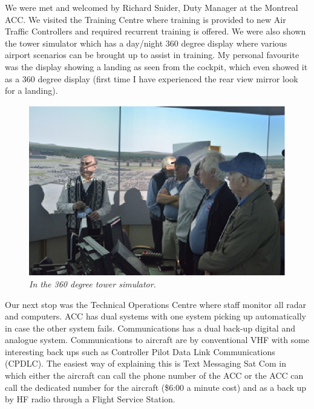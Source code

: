 We were met and welcomed by Richard Snider, Duty Manager at the
Montreal ACC. We visited the Training Centre where training is
provided to new Air Traffic Controllers and required recurrent
training is offered. We were also shown the tower simulator which has
a day/night 360 degree display where various airport scenarios can be
brought up to assist in training. My personal favourite was the
display showing a landing as seen from the cockpit, which even showed
it as a 360 degree display (first time I have experienced the rear
view mirror look for a landing).

\begin{figure}[htbp]
   \vspace{2em}
   \centering
   \includegraphics[scale=0.5]{yul_tca3.eps}
   \caption*{\small \em In the 360 degree tower simulator.}
   \label{fig:tca3}
\end{figure}

Our next stop was the Technical Operations Centre where staff monitor
all radar and computers. ACC has dual systems with one system picking
up automatically in case the other system fails. Communications has a
dual back-up digital and analogue system.  Communications to aircraft
are by conventional VHF with some interesting back ups such as
Controller Pilot Data Link Communications (CPDLC). The easiest way of
explaining this is Text Messaging Sat Com in which either the aircraft
can call the phone number of the ACC or the ACC can call the dedicated
number for the aircraft (\$6:00 a minute cost) and as a back up by HF
radio through a Flight Service Station.

